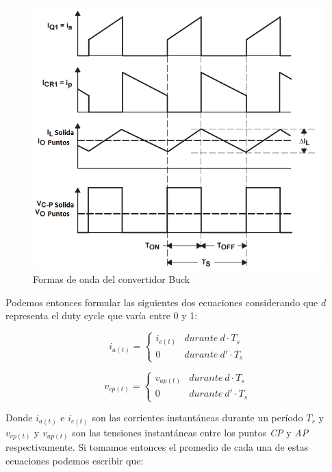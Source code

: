 \documentclass[12pt]{report}
\begin{document}
	\begin{figure}[H]
		\centering
		\includegraphics[width=\textwidth,height=\textheight,keepaspectratio]{buck_control_waveforms}
		\caption{Formas de onda del convertidor Buck}
	\end{figure}

	Podemos entonces formular las siguientes dos ecuaciones considerando que $d$ representa el duty cycle que varía entre 0 y 1:
	
	\begin{equation}
		i_{a(t)} = \left\{
		\begin{array}{ll}
			i_{c(t)} & durante \ d \cdot T_s \\
			0 & durante \ d' \cdot T_s
		\end{array}
		\right.
	\end{equation}
	
	\begin{equation}
		v_{cp(t)} = \left\{
		\begin{array}{ll}
			v_{ap(t)} & durante \ d \cdot T_s \\
			0 & durante \ d' \cdot T_s
		\end{array}
		\right.
	\end{equation}
	
	Donde $i_{a(t)}$ e $i_{c(t)}$ son las corrientes instantáneas durante un período $T_s$ y $v_{cp(t)}$ y $v_{ap(t)}$ son las tensiones instantáneas entre los puntos \textit{CP} y \textit{AP} respectivamente. Si tomamos entonces el promedio de cada una de estas ecuaciones podemos escribir que:
	
\end{document}
